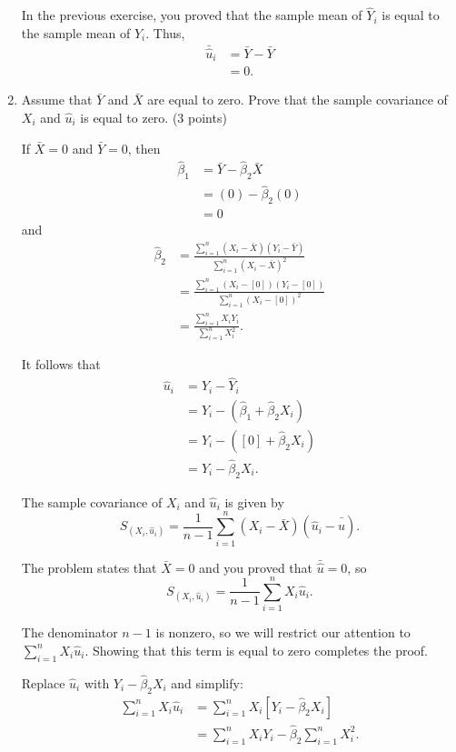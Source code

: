 \documentclass[11pt]{article}
\begin{document}
\begin{onehalfspacing}
\begin{enumerate}
{	In the previous exercise, you proved that the sample mean of $\hat{Y}_i$ is equal to the sample mean of $Y_i$. Thus,
	\begin{align*}
	\bar{\hat{u}}_i &= \bar{Y} - \bar{Y} \\
	&= 0.
	\end{align*}
}

\item Assume that $\bar{Y}$ and $\bar{X}$ are equal to zero. Prove that the sample covariance of $X_i$ and $\hat{u}_i$ is equal to zero. (3 points)\\


{\color{pine_green}
	If $\bar{X} = 0$ and $\bar{Y} = 0$, then
	\begin{align*}
	\hat{\beta}_1 &= \bar{Y} - \hat{\beta}_2\bar{X} \\
	&= (0) - \hat{\beta}_2 (0) \\
	&= 0
	\end{align*}
	and
	\begin{align*}
	\hat{\beta}_2 &= \frac{\sum_{i=1}^n (X_i - \bar{X})(Y_i - \bar{Y})}{\sum_{i=1}^n (X_i - \bar{X})^2} \\
	&= \frac{\sum_{i=1}^n (X_i - [0])(Y_i - [0])}{\sum_{i=1}^n (X_i - [0])^2} \\
	&= \frac{\sum_{i=1}^n X_i Y_i}{\sum_{i=1}^n X_i^2}.
	\end{align*}

	It follows that 
	\begin{align*}
	\hat{u}_i &= Y_i - \hat{Y}_i \\
	&= Y_i - (\hat{\beta}_1 + \hat{\beta}_2 X_i) \\
	&= Y_i - ([0]+ \hat{\beta}_2 X_i) \\
	&= Y_i - \hat{\beta}_2 X_i.
	\end{align*}
	
	The sample covariance of $X_i$ and $\hat{u}_i$ is given by 
	$$ S_{(X_i, \hat{u}_i)} = \frac{1}{n - 1} \sum_{i=1}^n (X_i - \bar{X}) (\hat{u}_i - \bar{\hat{u}}). $$
	
	The problem states that $\bar{X} = 0$ and you proved that $\bar{\hat{u}}=0$, so 
	$$ S_{(X_i, \hat{u}_i)} = \frac{1}{n - 1} \sum_{i=1}^n X_i \hat{u}_i. $$
	
	The denominator $n-1$ is nonzero, so we will restrict our attention to $\sum_{i=1}^n X_i \hat{u}_i$. Showing that this term is equal to zero completes the proof.
	
	Replace $\hat{u}_i$ with $Y_i - \hat{\beta}_2 X_i$ and simplify:
	\begin{align*}
	\sum_{i=1}^n X_i \hat{u}_i &= \sum_{i=1}^n X_i [Y_i - \hat{\beta}_2 X_i] \\
	&= \sum_{i=1}^n X_i Y_i - \hat{\beta}_2 \sum_{i=1}^n X_i^2.
	\end{align*}
	
}
\end{enumerate}
\end{onehalfspacing}
\end{document}
